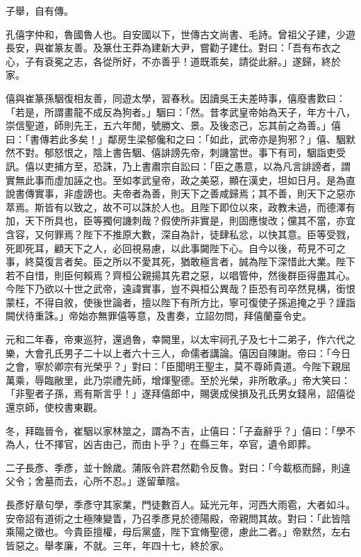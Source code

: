 \begin{pinyinscope}
子舉，自有傳。

孔僖字仲和，魯國魯人也。自安國以下，世傳古文尚書、毛詩。曾祖父子建，少遊長安，與崔篆友善。及篆仕王莽為建新大尹，嘗勸子建仕。對曰：「吾有布衣之心，子有袞冕之志，各從所好，不亦善乎！道既乖矣，請從此辭。」遂歸，終於家。

僖與崔篆孫駰復相友善，同遊太學，習春秋。因讀吳王夫差時事，僖廢書歎曰：「若是，所謂畫龍不成反為狗者。」駰曰：「然。昔孝武皇帝始為天子，年方十八，崇信聖道，師則先王，五六年閒，號勝文、景。及後恣己，忘其前之為善。」僖曰：「書傳若此多矣！」鄰房生梁郁儳和之曰：「如此，武帝亦是狗邪？」僖、駰默然不對。郁怒恨之，陰上書告駰、僖誹謗先帝，刺譏當世。事下有司，駰詣吏受訊。僖以吏捕方至，恐誅，乃上書肅宗自訟曰：「臣之愚意，以為凡言誹謗者，謂實無此事而虛加誣之也。至如孝武皇帝，政之美惡，顯在漢史，坦如日月。是為直說書傳實事，非虛謗也。夫帝者為善，則天下之善咸歸焉；其不善，則天下之惡亦萃焉。斯皆有以致之，故不可以誅於人也。且陛下即位以來，政教未過，而德澤有加，天下所具也，臣等獨何譏刺哉？假使所非實是，則固應悛改；儻其不當，亦宜含容，又何罪焉？陛下不推原大數，深自為計，徒肆私忿，以快其意。臣等受戮，死即死耳，顧天下之人，必回視易慮，以此事闚陛下心。自今以後，苟見不可之事，終莫復言者矣。臣之所以不愛其死，猶敢極言者，誠為陛下深惜此大業。陛下若不自惜，則臣何賴焉？齊桓公親揚其先君之惡，以唱管仲，然後群臣得盡其心。今陛下乃欲以十世之武帝，遠諱實事，豈不與桓公異哉？臣恐有司卒然見構，銜恨蒙枉，不得自敘，使後世論者，擅以陛下有所方比，寧可復使子孫追掩之乎？謹詣闕伏待重誅。」帝始亦無罪僖等意，及書奏，立詔勿問，拜僖蘭臺令史。

元和二年春，帝東巡狩，還過魯，幸闕里，以太牢祠孔子及七十二弟子，作六代之樂，大會孔氏男子二十以上者六十三人，命儒者講論。僖因自陳謝。帝曰：「今日之會，寧於卿宗有光榮乎？」對曰：「臣聞明王聖主，莫不尊師貴道。今陛下親屈萬乘，辱臨敝里，此乃崇禮先師，增煇聖德。至於光榮，非所敢承。」帝大笑曰：「非聖者子孫，焉有斯言乎！」遂拜僖郎中，賜褒成侯損及孔氏男女錢帛，詔僖從還京師，使校書東觀。

冬，拜臨晉令，崔駰以家林筮之，謂為不吉，止僖曰：「子盍辭乎？」僖曰：「學不為人，仕不擇官，凶吉由己，而由卜乎？」在縣三年，卒官，遺令即葬。

二子長彥、季彥，並十餘歲。蒲阪令許君然勸令反魯。對曰：「今載柩而歸，則違父令；舍墓而去，心所不忍。」遂留華陰。

長彥好章句學，季彥守其家業，門徒數百人。延光元年，河西大雨雹，大者如斗。安帝詔有道術之士極陳變眚，乃召季彥見於德陽殿，帝親問其故。對曰：「此皆陰乘陽之徵也。今貴臣擅權，母后黨盛，陛下宜脩聖德，慮此二者。」帝默然，左右皆惡之。舉孝廉，不就。三年，年四十七，終於家。


\end{pinyinscope}
